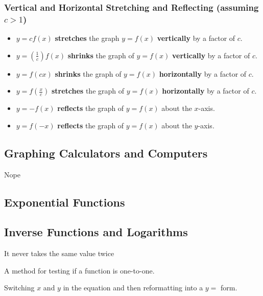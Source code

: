 \documentclass[11pt]{article}
\theoremstyle{plain}
\theoremstyle{definition}
\begin{document}
\subsubsection{Vertical and Horizontal Stretching and Reflecting (assuming $c>1$)}

\begin{itemize}
	\item $y=cf(x)$ \textbf{stretches} the graph $y=f(x)$ \textbf{vertically} by a factor of $c$.
	\item $y=(\frac{1}{c})f(x)$ \textbf{shrinks} the graph of $y=f(x)$ \textbf{vertically} by a factor of $c$.
	\item $y=f(cx)$ \textbf{shrinks} the graph of $y=f(x)$ \textbf{horizontally} by a factor of $c$.
	\item $y=f(\frac{x}{c})$ \textbf{stretches} the graph of $y=f(x)$ \textbf{horizontally} by a factor of $c$.
	\item $y=-f(x)$ \textbf{reflects} the graph of $y=f(x)$ about the $x$-axis.
	\item $y=f(-x)$ \textbf{reflects} the graph of $y=f(x)$ about the $y$-axis.
\end{itemize}



\subsection{Graphing Calculators and Computers}

Nope

\subsection{Exponential Functions}




\subsection{Inverse Functions and Logarithms}

\begin{description}[style=nextline]
	\item[One-to-one Function] It never takes the same value twice
	\item[Horizontal Line Test] A method for testing if a function is one-to-one. 	
	\item[Inverse Function] Switching $x$ and $y$ in the equation and then reformatting into a $y=$ form.
\end{description}
\end{document}
